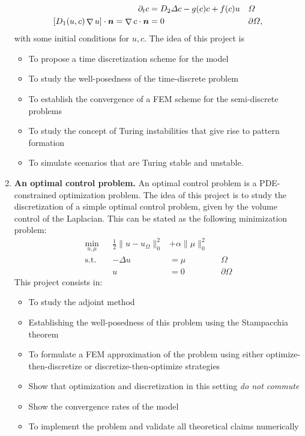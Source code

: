 \documentclass{article}
\renewcommand{\vec}{\vectorsym}
\DeclareMathOperator{\grad}{\nabla}
\begin{document}
\begin{enumerate}
$$\begin{aligned}
            \partial_t c &= D_2\Delta c - g(c) c + f(c) u && \Omega \\
            [D_1(u,c)\grad u]\cdot \vec n = \grad c\cdot \vec n &= 0 && \partial \Omega,
        \end{aligned} $$
        with some initial conditions for $u,c$. The idea of this project is
        \begin{itemize}
            \item To propose a time discretization scheme for the model 
            \item To study the well-posedness of the time-discrete problem
            \item To establish the convergence of a FEM scheme for the semi-discrete problems
            \item To study the concept of Turing instabilities that give rise to pattern formation
            \item To simulate scenarios that are Turing stable and unstable. 
        \end{itemize}

    \item \textbf{An optimal control problem.} An optimal control problem is a PDE-constrained optimization problem. The idea of this project is to study the discretization of a simple optimal control problem, given by the volume control of the Laplacian. This can be stated as the following minimization problem: 
        $$ \begin{aligned} \min_{u,\mu} && \frac 1 2 \|u - u_\Omega\|_0^2 &+ \alpha \|\mu\|_0^2 && \\
            \text{s.t.} && -\Delta u &= \mu &&  \Omega \\
                        && u &= 0 && \partial\Omega
        \end{aligned} $$
        This project consists in:
        \begin{itemize}
            \item To study the adjoint method
            \item Establishing the well-posedness of this problem using the Stampacchia theorem
            \item To formulate a FEM approximation of the problem using either optimize-then-discretize or discretize-then-optimize strategies
            \item Show that optimization and discretization in this setting \emph{do not commute}
            \item Show the convergence rates of the model
            \item To implement the problem and validate all theoretical claims numerically
        \end{itemize}


\end{enumerate}
\end{document}
